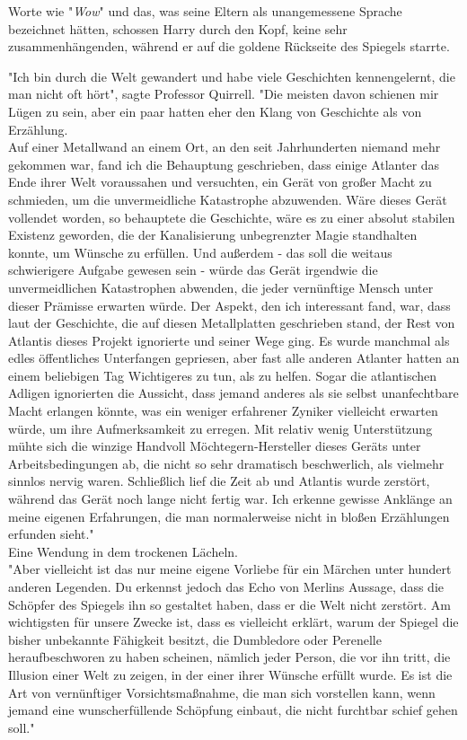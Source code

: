 {Worte wie "\emph{Wow}" und das, was seine Eltern als unangemessene Sprache bezeichnet hätten, schossen Harry durch den Kopf, keine sehr zusammenhängenden, während er auf die goldene Rückseite des Spiegels starrte.

"Ich bin durch die Welt gewandert und habe viele Geschichten kennengelernt, die man nicht oft hört", sagte Professor Quirrell. "Die meisten davon schienen mir Lügen zu sein, aber ein paar hatten eher den Klang von Geschichte als von Erzählung.\\ Auf einer Metallwand an einem Ort, an den seit Jahrhunderten niemand mehr gekommen war, fand ich die Behauptung geschrieben, dass einige Atlanter das Ende ihrer Welt voraussahen und versuchten, ein Gerät von großer Macht zu schmieden, um die unvermeidliche Katastrophe abzuwenden. Wäre dieses Gerät vollendet worden, so behauptete die Geschichte, wäre es zu einer absolut stabilen Existenz geworden, die der Kanalisierung unbegrenzter Magie standhalten konnte, um Wünsche zu erfüllen. Und außerdem - das soll die weitaus schwierigere Aufgabe gewesen sein - würde das Gerät irgendwie die unvermeidlichen Katastrophen abwenden, die jeder vernünftige Mensch unter dieser Prämisse erwarten würde. Der Aspekt, den ich interessant fand, war, dass laut der Geschichte, die auf diesen Metallplatten geschrieben stand, der Rest von Atlantis dieses Projekt ignorierte und seiner Wege ging. Es wurde manchmal als edles öffentliches Unterfangen gepriesen, aber fast alle anderen Atlanter hatten an einem beliebigen Tag Wichtigeres zu tun, als zu helfen. Sogar die atlantischen Adligen ignorierten die Aussicht, dass jemand anderes als sie selbst unanfechtbare Macht erlangen könnte, was ein weniger erfahrener Zyniker vielleicht erwarten würde, um ihre Aufmerksamkeit zu erregen. Mit relativ wenig Unterstützung mühte sich die winzige Handvoll Möchtegern-Hersteller dieses Geräts unter Arbeitsbedingungen ab, die nicht so sehr dramatisch beschwerlich, als vielmehr sinnlos nervig waren. Schließlich lief die Zeit ab und Atlantis wurde zerstört, während das Gerät noch lange nicht fertig war. Ich erkenne gewisse Anklänge an meine eigenen Erfahrungen, die man normalerweise nicht in bloßen Erzählungen erfunden sieht."\\ Eine Wendung in dem trockenen Lächeln.\\ "Aber vielleicht ist das nur meine eigene Vorliebe für ein Märchen unter hundert anderen Legenden. Du erkennst jedoch das Echo von Merlins Aussage, dass die Schöpfer des Spiegels ihn so gestaltet haben, dass er die Welt nicht zerstört. Am wichtigsten für unsere Zwecke ist, dass es vielleicht erklärt, warum der Spiegel die bisher unbekannte Fähigkeit besitzt, die Dumbledore oder Perenelle heraufbeschworen zu haben scheinen, nämlich jeder Person, die vor ihn tritt, die Illusion einer Welt zu zeigen, in der einer ihrer Wünsche erfüllt wurde. Es ist die Art von vernünftiger Vorsichtsmaßnahme, die man sich vorstellen kann, wenn jemand eine wunscherfüllende Schöpfung einbaut, die nicht furchtbar schief gehen soll."

}
